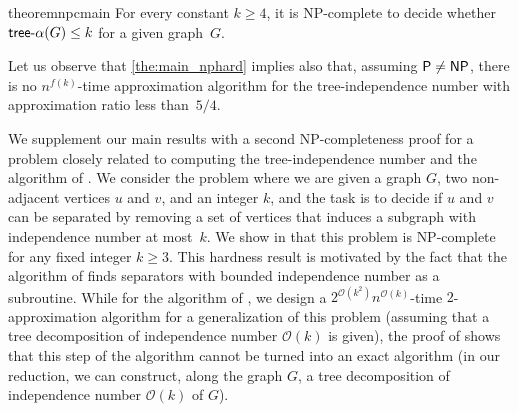\documentclass[11pt]{article}
\theoremstyle{definition}
\newcommand{\tin}{\mathsf{tree} \textnormal{-} \alpha}
\renewcommand{\P}{\textup{\textsf{P}}}
\newcommand{\NP}{\textup{\textsf{NP}}}
\newcommand{\OO}{\mathcal{O}}
\begin{document}
\begin{restatable}{theorem}{npcmain}
\label{the:main_nphard}
For every constant $k\geq 4$, it is \NP-complete to decide whether $\tin(G)\leq k$ for a given graph~$G$.
\end{restatable}

 Let us observe that  \cref{the:main_nphard} implies also that, assuming $\P \neq \NP$, there is no $n^{f(k)}$-time approximation algorithm for the tree-independence number with approximation ratio less than~$5/4$.

We supplement our main results with a second \NP-completeness proof for a problem closely related to computing the tree-independence number and the algorithm of .
We consider the problem where we are given a graph $G$, two non-adjacent vertices $u$ and $v$, and an integer $k$, and the task is to decide if $u$ and $v$ can be separated by removing a set of vertices that induces a subgraph with independence number at most~$k$.
We show in  that this problem is \NP-complete for any fixed integer $k \ge 3$.
This hardness result is motivated by the fact that the algorithm of  finds separators with bounded independence number as a subroutine.
While for the algorithm of , we design a $2^{\OO(k^2)} n^{\OO(k)}$-time $2$-approximation algorithm for a generalization of this problem (assuming that a tree decomposition of independence number $\OO(k)$ is given), the proof of  shows that this step of the algorithm cannot be turned into an exact algorithm (in our reduction, we can construct, along the graph $G$, a tree decomposition of independence number $\OO(k)$ of $G$).
\end{document}
